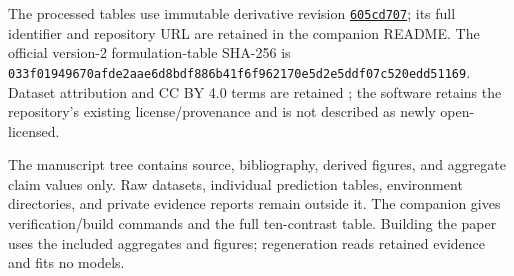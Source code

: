\documentclass[conference,letterpaper]{IEEEtran}
\newcommand{\code}[1]{\texttt{#1}}
\begin{document}
The processed tables use immutable derivative revision \href{https://github.com/mdsamad001/Drug_Release_Dynamics_Prediction/tree/605cd707c47a4379212193560cd332d7a2d973fd}{\code{605cd707}}; its full identifier and repository URL are retained in the companion README. The official version-2 formulation-table SHA-256 is \nolinkurl{033f01949670afde2aae6d8bdf886b41f6f962170e5d2e5ddf07c520edd51169}. Dataset attribution and CC BY 4.0 terms are retained \cite{baoData2024}; the software retains the repository's existing license/provenance and is not described as newly open-licensed.

The manuscript tree contains source, bibliography, derived figures, and aggregate claim values only. Raw datasets, individual prediction tables, environment directories, and private evidence reports remain outside it. The companion gives verification/build commands and the full ten-contrast table. Building the paper uses the included aggregates and figures; regeneration reads retained evidence and fits no models.



\end{document}
